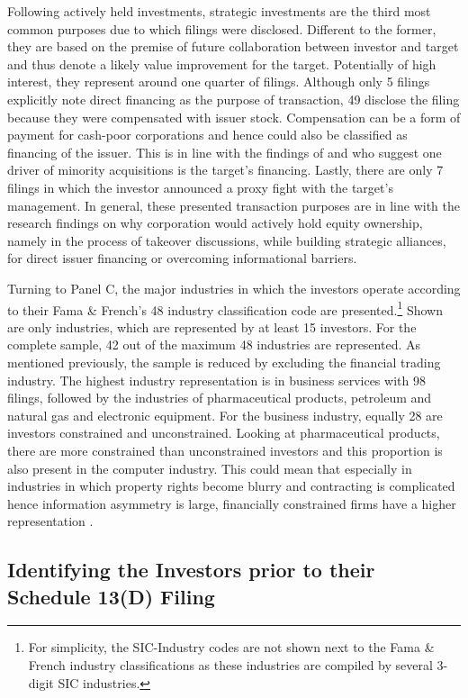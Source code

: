 \documentclass[12pt]{article}
\begin{document}
Following actively held investments, strategic investments are the third most common purposes due to which filings were disclosed. Different to the former, they are based on the premise of future collaboration between investor and target and thus denote a likely value improvement for the target. Potentially of high interest, they represent around one quarter of filings. Although only 5 filings explicitly note direct financing as the purpose of transaction, 49 disclose the filing because they were compensated with issuer stock. Compensation can be a form of payment for cash-poor corporations and hence could also be classified as financing of the issuer. This is in line with the findings of \citet[p.2792]{Allen2000} and \citet[p.78]{Liao2014} who suggest one driver of minority acquisitions is the target's financing. Lastly, there are only 7 filings in which the investor announced a proxy fight with the target's management. In general, these presented transaction purposes are in line with the research findings on why corporation would actively hold equity ownership, namely in the process of takeover discussions, while building strategic alliances, for direct issuer financing or overcoming informational barriers.\par
Turning to Panel C, the major industries in which the investors operate according to their Fama \& French's 48 industry classification code are presented.\footnote{For simplicity, the SIC-Industry codes are not shown next to the Fama \& French industry classifications as these industries are compiled by several 3-digit SIC industries.} Shown are only industries, which are represented by at least 15 investors. For the complete sample, 42 out of the maximum 48 industries are represented. As mentioned previously, the sample is reduced by excluding the financial trading industry. The highest industry representation is in business services with 98 filings, followed by the industries of pharmaceutical products, petroleum and natural gas and electronic equipment. For the business industry, equally 28 are investors constrained and unconstrained. Looking at pharmaceutical products, there are more constrained than unconstrained investors and this proportion is also present in the computer industry. This could mean that especially in industries in which property rights become blurry and contracting is complicated hence information asymmetry is large, financially constrained firms have a higher representation \citep[p.4]{Liao2014}.

\subsection{Identifying the Investors prior to their Schedule 13(D) Filing}
\end{document}

